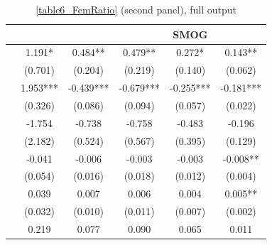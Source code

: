 \begin{table}
    \footnotesize
    \centering
    \begin{threeparttable}
        \caption{\autoref{table6_FemRatio} (second panel), full output}
        \label{table6_change_full}
        \begin{tabular}{p{3cm}S@{}S@{}S@{}S@{}S@{}}
            \toprule
            &{}&{}&{}&{SMOG}&{}\\
            \midrule
                  &       1.191*  &       0.484** &       0.479** &       0.272*  &       0.143** \\
                                          &     {(0.701)}   &     {(0.204)}   &     {(0.219)}   &     {(0.140)}   &     {(0.062)}   \\
                  &       1.953***&      -0.439***&      -0.679***&      -0.255***&      -0.181***\\
                                          &     {(0.326)}   &     {(0.086)}   &     {(0.094)}   &     {(0.057)}   &     {(0.022)}   \\
            &      -1.754   &      -0.738   &      -0.758   &      -0.483   &      -0.196   \\
                                          &     {(2.182)}   &     {(0.524)}   &     {(0.567)}   &     {(0.395)}   &     {(0.129)}   \\
                    &      -0.041   &      -0.006   &      -0.003   &      -0.003   &      -0.008** \\
                                          &     {(0.054)}   &     {(0.016)}   &     {(0.018)}   &     {(0.012)}   &     {(0.004)}   \\
                    &       0.039   &       0.007   &       0.006   &       0.004   &       0.005** \\
                                          &     {(0.032)}   &     {(0.010)}   &     {(0.011)}   &     {(0.007)}   &     {(0.002)}   \\
                       &       0.219   &       0.077   &       0.090   &       0.065   &       0.011   \\

\end{tabular}
\end{threeparttable}
\end{table}
